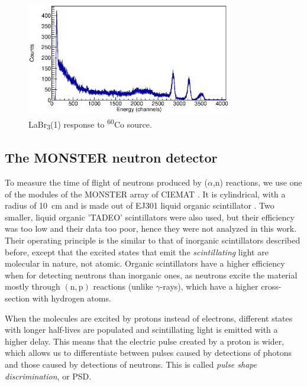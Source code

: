 \documentclass[a4paper,12pt]{report}
\newcommand{\an}{($\alpha$,n) }
\begin{document}
\begin{figure}[H]
	\centering
	\includegraphics[width=0.80\textwidth]{labr_co60_calibration.eps}
	\caption{LaBr\textsubscript{3}(1) response to \textsuperscript{60}Co source.}
	\label{labr_co60_calibration}
\end{figure}

\subsection{The MONSTER neutron detector}
To measure the time of flight of neutrons produced by \an reactions, we use one of the modules of the MONSTER array of CIEMAT \cite{MONSTER}.
It is cylindrical, with a radius of \qty{10}{\cm} and is made out of EJ301 liquid organic scintillator \cite{ej301}.
Two smaller, liquid organic 'TADEO' scintillators were also used, but their efficiency was too low and their data too poor, hence they were not analyzed in this work.
\\

Their operating principle is the similar to that of inorganic scintillators described before, except that the excited states that emit the \textit{scintillating} light are molecular in nature, not atomic.
Organic scintillators have a higher efficiency when for detecting neutrons than inorganic ones, as neutrons excite the material mostly through $\left( \text{n},\text{p}  \right)$ reactions (unlike $\gamma$-rays), which have a higher cross-section with hydrogen atoms.

When the molecules are excited by protons instead of electrons, different states with longer half-lives are populated and scintillating light is emitted with a higher delay.
This means that the electric pulse created by a proton is wider, which allows us to differentiate between pulses caused by detections of photons and those caused by detections of neutrons.
This is called \textit{pulse shape discrimination}, or PSD.
\end{document}
